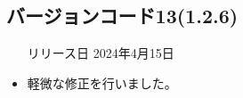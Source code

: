 \subsection*{バージョンコード13(1.2.6)}
\begin{itemize}
    \item[リリース日] 2024年4月15日
\end{itemize}

\new \par
\change \par
\fix
\begin{itemize}
    \item 軽微な修正を行いました。
\end{itemize}

